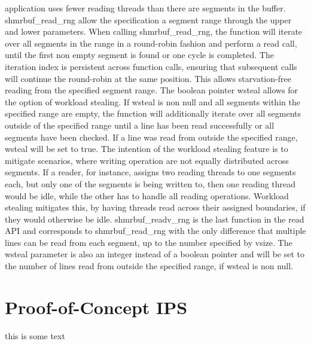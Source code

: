 application uses fewer reading threads than there are segments in the buffer. shmrbuf\_read\_rng allow the specification a segment range through the upper
and lower parameters. When calling shmrbuf\_read\_rng, the function will iterate over all segments in the range in a round-robin fashion and perform a read call, until the first non empty segment is found or one cycle is completed.
The iteration index is persistent across function calls, ensuring that subsequent calls will continue the round-robin at the same position. This allows
starvation-free reading from the specified segment range. The boolean pointer wsteal allows for the option of workload stealing.
If wsteal is non null and all segments within the specified range are empty, the function will additionally iterate over all
segments outside of the specified range until a line has been read successfully or all segments have been checked. If a line was read from 
outside the specified range, wsteal will be set to true. The intention of the workload stealing feature is to mitigate scenarios,
where writing operation are not equally distributed across segments. If a reader, for instance, assigns two reading threads to one segments each,
but only one of the segments is being written to, then one reading thread would be idle, while the other has to handle all reading operations.
Workload stealing mitigates this, by having threads read across their assigned boundaries, if they would otherwise be idle.
shmrbuf\_readv\_rng is the last function in the read API and corresponds to shmrbuf\_read\_rng with the only difference
that multiple lines can be read from each segment, up to the number specified by vsize. The wsteal parameter is
also an integer instead of a boolean pointer and will be set to the number of lines read from outside the specified range, if wsteal is non null.

\section{Proof-of-Concept IPS}

\begin{algorithm}[h!]
    
    \label{alg:uring_getline}
    \caption[Asynchronous line reading]{this is some text}
\end{algorithm}

